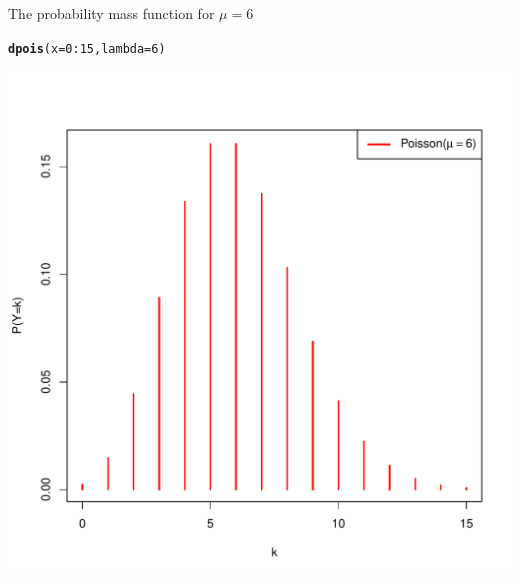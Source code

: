 \documentclass[10pt]{beamer}\usepackage[]{graphicx}\usepackage[]{color}
\makeatletter
\def\maxwidth{ %
  \ifdim\Gin@nat@width>\linewidth
    \linewidth
  \else
    \Gin@nat@width
  \fi
}
\newcommand{\hlnum}[1]{\textcolor[rgb]{0.686,0.059,0.569}{#1}}%
\newcommand{\hlopt}[1]{\textcolor[rgb]{0,0,0}{#1}}%
\newcommand{\hlstd}[1]{\textcolor[rgb]{0.345,0.345,0.345}{#1}}%
\newcommand{\hlkwc}[1]{\textcolor[rgb]{0.333,0.667,0.333}{#1}}%
\newcommand{\hlkwd}[1]{\textcolor[rgb]{0.737,0.353,0.396}{\textbf{#1}}}%
\newenvironment{kframe}{%
 \def\at@end@of@kframe{}%
 \ifinner\ifhmode%
  \def\at@end@of@kframe{\end{minipage}}%
  \begin{minipage}{\columnwidth}%
 \fi\fi%
 \def\FrameCommand##1{\hskip\@totalleftmargin \hskip-\fboxsep
 \colorbox{shadecolor}{##1}\hskip-\fboxsep
     \hskip-\linewidth \hskip-\@totalleftmargin \hskip\columnwidth}%
 \MakeFramed {\advance\hsize-\width
   \@totalleftmargin\z@ \linewidth\hsize
   \@setminipage}}%
 {\par\unskip\endMakeFramed%
 \at@end@of@kframe}
\newenvironment{knitrout}{}{} %
\makeatother
\begin{document}
\begin{frame}[fragile]{The probability mass function for $\mu=6$}
	
\begin{knitrout}\tiny
{}\color{fgcolor}\begin{kframe}
\begin{alltt}
\hlkwd{dpois}\hlstd{(}\hlkwc{x} \hlstd{=} \hlnum{0}\hlopt{:}\hlnum{15}\hlstd{,} \hlkwc{lambda} \hlstd{=} \hlnum{6}\hlstd{)}
\end{alltt}
\end{kframe}
\end{knitrout}
	
	\vspace*{-0.5in}
	
\begin{knitrout}\tiny
{}\color{fgcolor}

{\centering \includegraphics[width=\maxwidth]{figure/unnamed-chunk-11-1} 

}


\end{knitrout}
	
\end{frame}
\end{document}
